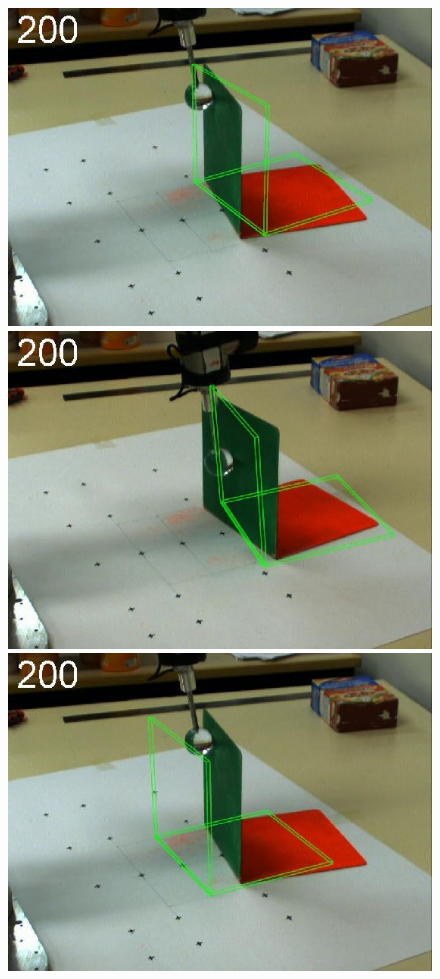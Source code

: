 \begin{figure}[tb]
{\includegraphics[width=\imgBXwid]{./B2_2exp_58_3}
\includegraphics[width=\imgBXwid]{./B2_2exp_38_3}
\includegraphics[width=\imgBXwid]{./B2_LWPR1_58_3}
}


\end{figure}
